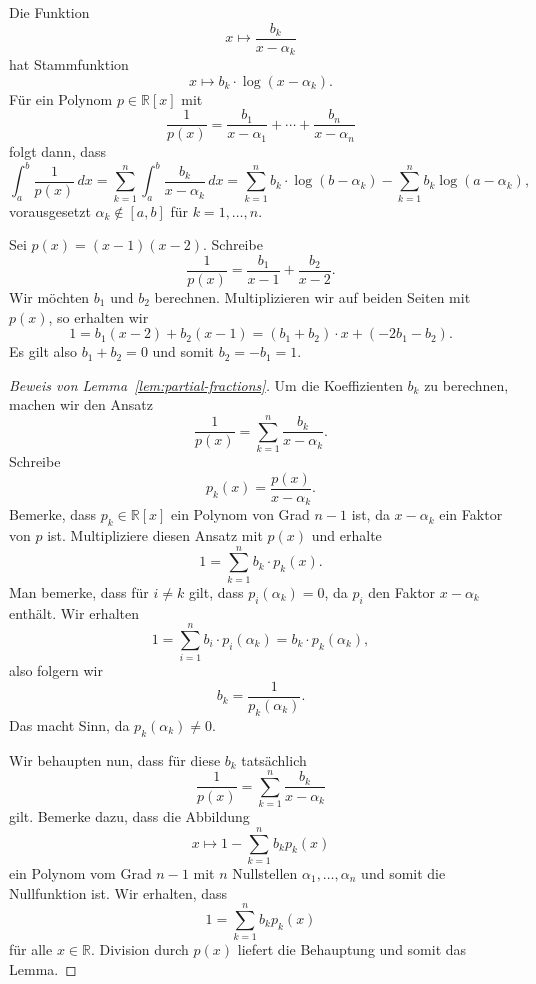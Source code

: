 \documentclass[../main.tex]{subfiles}
\begin{document}
\begin{application}
  Die Funktion
  \[
    x \mapsto \frac{b_k}{x - \alpha_k}
  \]
  hat Stammfunktion
  \[
    x \mapsto b_k \cdot \log (x - \alpha_k).
  \]
  Für ein Polynom $p \in \mathbb{R}[x]$ mit
  \[
    \frac{1}{p(x)} = \frac{b_1}{x - \alpha_1}
    + \cdots + \frac{b_n}{x - \alpha_n}
  \]
  folgt dann, dass
  \[
    \int_{a}^{b} \frac{1}{p(x)} \, dx
    = \sum_{k=1}^{n} \int_{a}^{b} \frac{b_k}{x - \alpha_k} \, dx
    = \sum_{k=1}^{n} b_k \cdot \log(b - \alpha_k)
    - \sum_{k=1}^{n} b_k \log(a - \alpha_k), %
  \]
  vorausgesetzt $\alpha_k \notin [a, b]$ für $k = 1, \dots, n$.
\end{application}

\begin{example}
  Sei $p(x) = (x - 1)(x - 2)$. Schreibe
  \[
    \frac{1}{p(x)} = \frac{b_1}{x - 1} + \frac{b_2}{x - 2}.
  \]
  Wir möchten $b_1$ und $b_2$ berechnen.
  Multiplizieren wir auf beiden Seiten mit $p(x)$,
  so erhalten wir
  \[
    1 = b_1 (x- 2) + b_2(x-1) = (b_1 + b_2) \cdot x
    + (-2b_1 - b_2).
  \]
  Es gilt also $b_1 + b_2 = 0$ und somit $b_2 = -b_1 = 1$.
\end{example}

\begin{proof}[Beweis von Lemma~\ref{lem:partial-fractions}]
  Um die Koeffizienten $b_k$ zu berechnen,
  machen wir den Ansatz
  \[
    \frac{1}{p(x)} = \sum_{k=1}^{n} \frac{b_k}{x - \alpha_k}.
  \]
  Schreibe
  \[
    p_k(x) = \frac{p(x)}{x - \alpha_k}.
  \]
  Bemerke, dass $p_k \in \mathbb{R}[x]$ ein Polynom
  von Grad $n-1$ ist, da $x - \alpha_k$ ein
  Faktor von $p$ ist.
  Multipliziere diesen Ansatz mit $p(x)$ und erhalte
  \[
    1 = \sum_{k=1}^{n} b_k \cdot p_k(x).
  \]
  Man bemerke, dass für $i \ne k$ gilt, dass
  $p_i(\alpha_k) = 0$, da $p_i$ den Faktor
  $x - \alpha_k$ enthält.
  Wir erhalten
  \[
    1 = \sum_{i=1}^{n} b_i \cdot p_i(\alpha_k) = b_k \cdot p_k(\alpha_k),
  \]
  also folgern wir
  \[
    b_k = \frac{1}{p_k(\alpha_k)}.
  \]
  Das macht Sinn, da $p_k(\alpha_k) \neq 0$.
 
  Wir behaupten nun, dass für diese $b_k$ tatsächlich
  \[
    \frac{1}{p(x)} = \sum_{k=1}^{n}  \frac{b_k}{x - \alpha_k}
  \]
  gilt.
  Bemerke dazu, dass die Abbildung
  \[
    x \mapsto 1 - \sum_{k=1}^{n} b_k p_k(x)
  \]
  ein Polynom vom Grad $n-1$ mit $n$ Nullstellen
  $\alpha_1, \dots, \alpha_n$ und somit die Nullfunktion ist.
  Wir erhalten, dass
  \[
    1 = \sum_{k=1}^{n} b_k p_k(x)
  \]
  für alle $x \in \mathbb{R}$.
  Division durch $p(x)$ liefert die Behauptung und somit
  das Lemma.
\end{proof}
\end{document}
